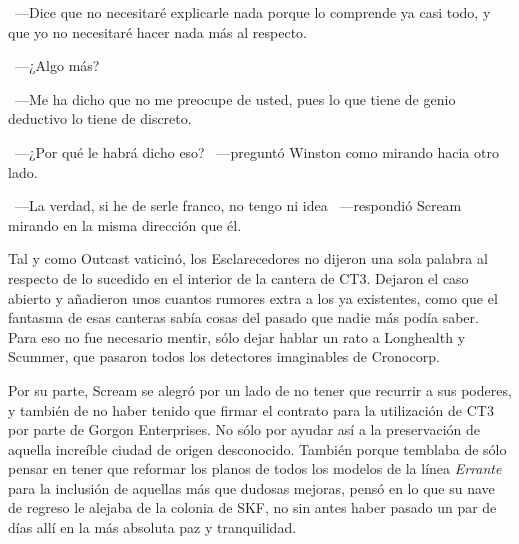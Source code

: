 ~---Dice que no necesitaré explicarle nada porque lo comprende ya casi todo, y que yo no necesitaré hacer nada más al respecto.

~---¿Algo más?

~---Me ha dicho que no me preocupe de usted, pues lo que tiene de genio deductivo lo tiene de discreto.

~---¿Por qué le habrá dicho eso? ~---preguntó Winston como mirando hacia otro lado.

~---La verdad, si he de serle franco, no tengo ni idea ~---respondió Scream mirando en la misma dirección que él.

\parbreak
Tal y como Outcast vaticinó, los Esclarecedores no dijeron una sola palabra al respecto de lo sucedido en el interior de la cantera de CT3. Dejaron el caso abierto y añadieron unos cuantos rumores extra a los ya existentes, como que el fantasma de esas canteras sabía cosas del pasado que nadie más podía saber. Para eso no fue necesario mentir, sólo dejar hablar un rato a Longhealth y Scummer, que pasaron todos los detectores imaginables de Cronocorp.

Por su parte, Scream se alegró por un lado de no tener que recurrir a sus poderes, y también de no haber tenido que firmar el contrato para la utilización de CT3 por parte de Gorgon Enterprises. No sólo por ayudar así a la preservación de aquella increíble ciudad de origen desconocido. También porque temblaba de sólo pensar en tener que reformar los planos de todos los modelos de la línea \emph{Errante} para la inclusión de aquellas más que dudosas mejoras, pensó en lo que su nave de regreso le alejaba de la colonia de SKF, no sin antes haber pasado un par de días allí en la más absoluta paz y tranquilidad.

\endinput
